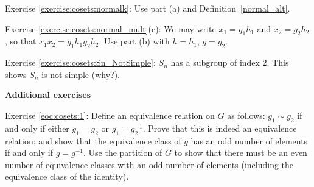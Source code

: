 \noindent Exercise \ref{exercise:cosets:normalk}:   Use part (a) and Definition~\ref{normal_alt}.

\noindent Exercise \ref{exercise:cosets:normal_mult}(c):  We may write $x_1 = g_1 h_1$ and $x_2 = g_2 h_2$, so that $x_1 x_2 = g_1 h_1 g_2 h_2$.  Use part (b) with $h=h_1$, $g=g_2$.

\noindent Exercise \ref{exercise:cosets:Sn_NotSimple}:  $S_n$ has a subgroup of index 2.  This shows $S_n$ is not simple  (why?).
\medskip

\textbf{Additional exercises}

\noindent Exercise \ref{eoc:cosets:1}:  Define an equivalence relation on $G$ as follows: $g_1 \sim g_2$ if and only if either $g_1 = g_2$ or $g_1 = g_2^{-1}$. Prove that this is indeed an equivalence relation; and show that the equivalence class of $g$ has an odd number of elements if and only if $g = g^{-1}$. Use the partition of $G$ to show that there must be an even number of  equivalence classes with an odd number of elements (including the equivalence class of the identity).

